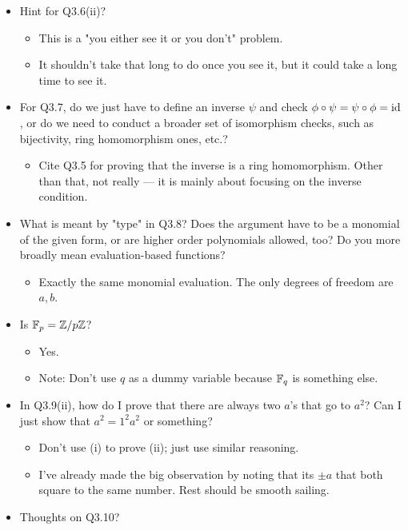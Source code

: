 \documentclass[../notes.tex]{subfiles}
\begin{document}
\begin{itemize}
\begin{itemize}
    \end{itemize}
    \item Hint for Q3.6(ii)?
    \begin{itemize}
        \item This is a "you either see it or you don't" problem.
        \item It shouldn't take that long to do once you see it, but it could take a long time to see it.
    \end{itemize}
    \item For Q3.7, do we just have to define an inverse $\psi$ and check $\phi\circ\psi=\psi\circ\phi=\operatorname{id}$, or do we need to conduct a broader set of isomorphism checks, such as bijectivity, ring homomorphism ones, etc.?
    \begin{itemize}
        \item Cite Q3.5 for proving that the inverse is a ring homomorphism. Other than that, not really --- it is mainly about focusing on the inverse condition.
    \end{itemize}
    \item What is meant by "type" in Q3.8? Does the argument have to be a monomial of the given form, or are higher order polynomials allowed, too? Do you more broadly mean evaluation-based functions?
    \begin{itemize}
        \item Exactly the same monomial evaluation. The only degrees of freedom are $a,b$.
    \end{itemize}
    \item Is $\mathbb{F}_p=\mathbb{Z}/p\mathbb{Z}$?
    \begin{itemize}
        \item Yes.
        \item Note: Don't use $q$ as a dummy variable because $\mathbb{F}_q$ is something else.
    \end{itemize}
    \item In Q3.9(ii), how do I prove that there are always two $a$'s that go to $a^2$? Can I just show that $a^2=1^2a^2$ or something?
    \begin{itemize}
        \item Don't use (i) to prove (ii); just use similar reasoning.
        \item I've already made the big observation by noting that its $\pm a$ that both square to the same number. Rest should be smooth sailing.
    \end{itemize}
    \item Thoughts on Q3.10?

\end{itemize}
\end{document}
